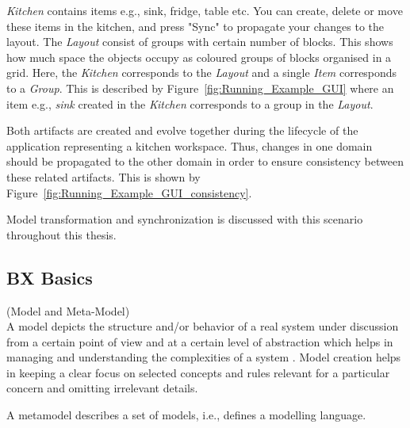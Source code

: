 \textit{Kitchen} contains items e.g., sink, fridge, table etc. You can create, delete or move these items in the kitchen, and press "Sync" to propagate your changes to the layout. The \textit{Layout} consist of groups with certain number of blocks. This shows how much space the objects occupy as coloured groups of blocks organised in a grid. Here, the \textit{Kitchen} corresponds to the \textit{Layout} and a single \textit{Item} corresponds to a \textit{Group}. This is described by Figure~\ref{fig:Running_Example_GUI} where an item e.g., \textit{sink} created in the \textit{Kitchen} corresponds to a group in the \textit{Layout}.

Both artifacts are created and evolve together during the lifecycle of the application representing a kitchen workspace. Thus, changes in one domain should be propagated to the other domain in order to ensure consistency between these related artifacts. This is shown by Figure~\ref{fig:Running_Example_GUI_consistency}.

Model transformation and synchronization is discussed with this scenario throughout this thesis. 

\subsection{BX Basics}\label{subsec:definitions}

\begin{defn}\label{defModel} (Model and Meta-Model)\\
A model depicts the structure and/or behavior of a real system under discussion from a certain point of view and at a certain level of abstraction which helps in managing and understanding the complexities of a system \cite{uml} \cite{mdsd}. Model creation helps in keeping a clear focus on selected concepts and rules relevant for a particular concern and omitting irrelevant details.

A metamodel describes a set of models, i.e., defines a modelling language. 
\end{defn} 

